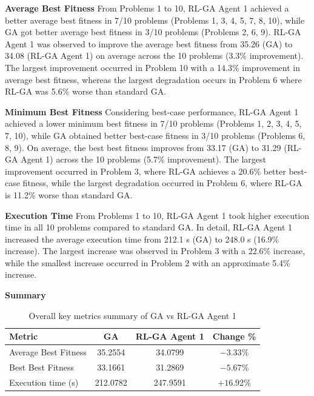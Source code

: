 \documentclass{article}
\begin{document}
\textbf{Average Best Fitness} \newline
From Problems 1 to 10, RL-GA Agent 1 achieved a better average best fitness in 7/10 problems (Problems 1, 3, 4, 5, 7, 8, 10), while GA got better average best fitness in 3/10 problems (Problems 2, 6, 9). RL-GA Agent 1 was observed to improve the average best fitness from 35.26 (GA) to 34.08 (RL-GA Agent 1) on average across the 10 problems (3.3\% improvement). The largest improvement occurred in Problem 10 with a 14.3\% improvement in average best fitness, whereas the largest degradation occurs in Problem 6 where RL-GA was 5.6\% worse than standard GA.

\textbf{Minimum Best Fitness} \newline
Considering best-case performance, RL-GA Agent 1 achieved a lower minimum best fitness in 7/10 problems (Problems 1, 2, 3, 4, 5, 7, 10), while GA obtained better best-case fitness in 3/10 problems (Problems 6, 8, 9). On average, the best best fitness improves from 33.17 (GA) to 31.29 (RL-GA Agent 1) across the 10 problems (5.7\% improvement). The largest improvement occurred in Problem 3, where RL-GA achieves a 20.6\% better best-case fitness, while the largest degradation occurred in Problem 6, where RL-GA is 11.2\% worse than standard GA.

\textbf{Execution Time} \newline
From Problems 1 to 10, RL-GA Agent 1 took higher execution time in all 10 problems compared to standard GA. In detail, RL-GA Agent 1 increased the average execution time from 212.1 s (GA) to 248.0 s (16.9\% increase). The largest increase was observed in Problem 3 with a 22.6\% increase, while the smallest increase occurred in Problem 2 with an approximate 5.4\% increase.

\textbf{Summary} \newline
\begin{table}[H]
\centering
\small
\begin{tabular}{lccc}
\toprule
\textbf{Metric} & \textbf{GA} & \textbf{RL-GA Agent 1} & \textbf{Change \%} \\
\midrule
Average Best Fitness   & 35.2554 & 34.0799 & $-3.33\%$ \\
Best Best Fitness      & 33.1661 & 31.2869 & $-5.67\%$ \\
Execution time (s)     & 212.0782 & 247.9591 & $+16.92\%$ \\
\bottomrule
\end{tabular}
\caption{Overall key metrics summary of GA vs RL-GA Agent 1}
\label{tab:overall_summary}
\end{table}
\end{document}
